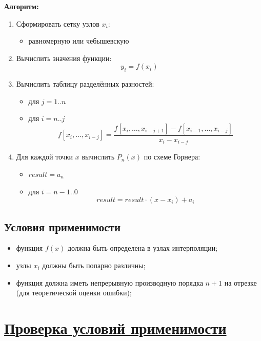 \documentclass[14pt]{extarticle}
\begin{document}
	\textbf{Алгоритм:}
	
	\begin{enumerate}
		\item Сформировать сетку узлов $x_i$:
		\begin{itemize}
			\item равномерную или чебышевскую
		\end{itemize}
		
		\item Вычислить значения функции:
		\[
		y_i = f(x_i)
		\]
		
		\item Вычислить таблицу разделённых разностей:
		\begin{itemize}
			\item для $j = 1..n$
			\item для $i = n..j$
			\[
			f[x_i,\dots,x_{i-j}] = \frac{f[x_i,\dots,x_{i-j+1}] - f[x_{i-1},\dots,x_{i-j}]}{x_i - x_{i-j}}
			\]
		\end{itemize}
		
		\item Для каждой точки $x$ вычислить $P_n(x)$ по схеме Горнера:
		\begin{itemize}
			\item $result = a_n$
			\item для $i = n-1..0$
			\[
			result = result \cdot (x - x_i) + a_i
			\]
		\end{itemize}
	\end{enumerate}
	
	\subsection{Условия применимости}
	
	\begin{itemize}
		\item функция $f(x)$ должна быть определена в узлах интерполяции;
		\item узлы $x_i$ должны быть попарно различны;
		\item функция должна иметь непрерывную производную порядка $n+1$ на отрезке (для теоретической оценки ошибки);
	\end{itemize}
	
	
	\section{\Large \underline{Проверка условий применимости}}
	
\end{document}
